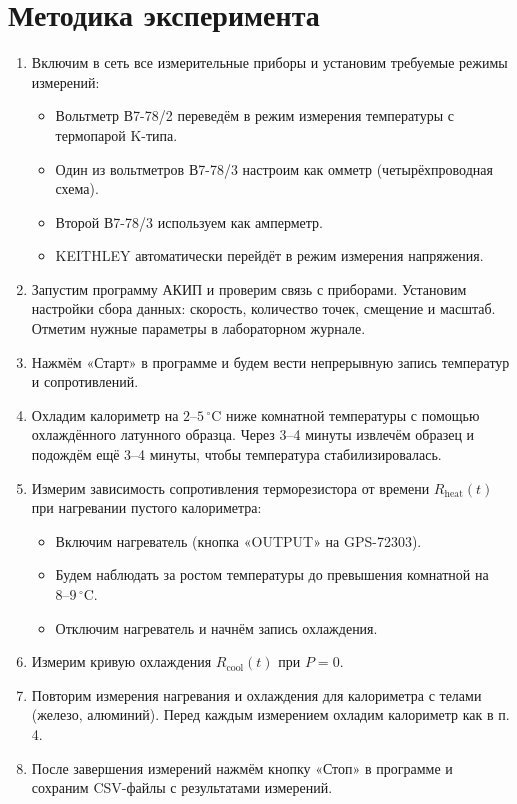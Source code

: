\documentclass[a4paper,12pt]{article} %
\begin{document}
\section*{Методика эксперимента}

\begin{enumerate}
	\item Включим в сеть все измерительные приборы и установим требуемые режимы измерений:
	\begin{itemize}
		\item Вольтметр В7-78/2 переведём в режим измерения температуры с термопарой K-типа.
		\item Один из вольтметров В7-78/3 настроим как омметр (четырёхпроводная схема).
		\item Второй В7-78/3 используем как амперметр.
		\item KEITHLEY автоматически перейдёт в режим измерения напряжения.
	\end{itemize}

	\item Запустим программу АКИП и проверим связь с приборами. Установим настройки сбора данных: скорость, количество точек, смещение и масштаб. Отметим нужные параметры в лабораторном журнале.

	\item Нажмём «Старт» в программе и будем вести непрерывную запись температур и сопротивлений.

	\item Охладим калориметр на $2\text{–}5\,^\circ\text{C}$ ниже комнатной температуры с помощью охлаждённого латунного образца. Через 3–4 минуты извлечём образец и подождём ещё 3–4 минуты, чтобы температура стабилизировалась.

	\item Измерим зависимость сопротивления терморезистора от времени $R_{\text{heat}}(t)$ при нагревании пустого калориметра:
	\begin{itemize}
		\item Включим нагреватель (кнопка «OUTPUT» на GPS-72303).
		\item Будем наблюдать за ростом температуры до превышения комнатной на $8\text{–}9\,^\circ\text{C}$.
		\item Отключим нагреватель и начнём запись охлаждения.
	\end{itemize}

	\item Измерим кривую охлаждения $R_{\text{cool}}(t)$ при $P = 0$.

	\item Повторим измерения нагревания и охлаждения для калориметра с телами (железо, алюминий). Перед каждым измерением охладим калориметр как в п. 4.

	\item После завершения измерений нажмём кнопку «Стоп» в программе и сохраним CSV-файлы с результатами измерений.

\end{enumerate}
\end{document}
